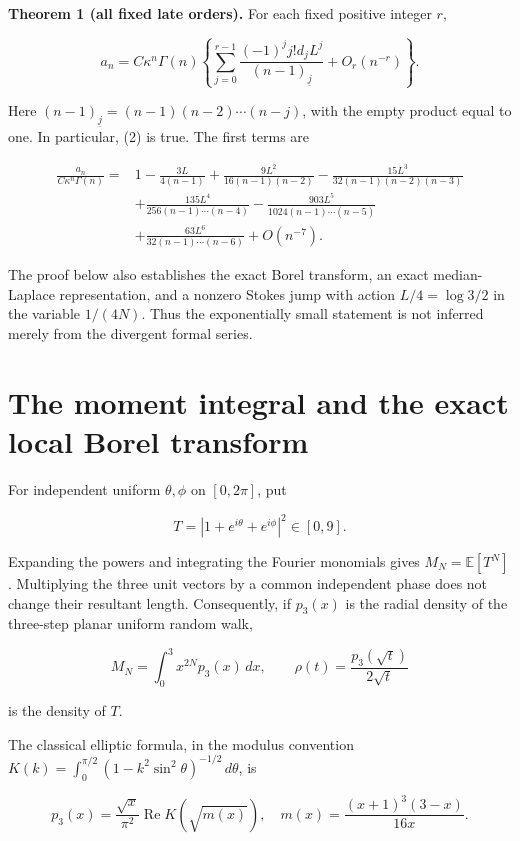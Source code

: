 \documentclass[11pt,letterpaper]{article}
\theoremstyle{remark}
\begin{document}
\textbf{Theorem 1 (all fixed late orders).} For each fixed positive
integer \(r\),

\[
\boxed{\displaystyle
 a_n=C\kappa^n\Gamma(n)
 \left\{\sum_{j=0}^{r-1}
 \frac{(-1)^j j!d_jL^j}{(n-1)_{\underline j}}+O_r(n^{-r})\right\}.}
\tag{4}
\]

Here \((n-1)_{\underline j}=(n-1)(n-2)\cdots(n-j)\), with the empty
product equal to one. In particular, (2) is true. The first terms are

\[
\begin{aligned}
\frac{a_n}{C\kappa^n\Gamma(n)}={}&1-\frac{3L}{4(n-1)}
+\frac{9L^2}{16(n-1)(n-2)}-\frac{15L^3}{32(n-1)(n-2)(n-3)}\\
&+\frac{135L^4}{256(n-1)\cdots(n-4)}
-\frac{903L^5}{1024(n-1)\cdots(n-5)}\\
&+\frac{63L^6}{32(n-1)\cdots(n-6)}+O(n^{-7}).
\end{aligned}
\tag{5}
\]

The proof below also establishes the exact Borel transform, an exact
median-Laplace representation, and a nonzero Stokes jump with action
\(L/4=\log3/2\) in the variable \(1/(4N)\). Thus the exponentially small
statement is not inferred merely from the divergent formal series.

\section{The moment integral and the exact local Borel
transform}\label{the-moment-integral-and-the-exact-local-borel-transform}

For independent uniform \(\theta,\phi\) on \([0,2\pi]\), put

\[
T=|1+e^{i\theta}+e^{i\phi}|^2\in[0,9].
\]

Expanding the powers and integrating the Fourier monomials gives
\(M_N=\mathbb E[T^N]\). Multiplying the three unit vectors by a common
independent phase does not change their resultant length. Consequently,
if \(p_3(x)\) is the radial density of the three-step planar uniform
random walk,

\[
M_N=\int_0^3x^{2N}p_3(x)\,dx,
\qquad \rho(t)=\frac{p_3(\sqrt t)}{2\sqrt t}
\tag{6}
\]

is the density of \(T\).

The classical elliptic formula, in the modulus convention
\(K(k)=\int_0^{\pi/2}(1-k^2\sin^2\theta)^{-1/2}\,d\theta\), is

\[
p_3(x)=\frac{\sqrt x}{\pi^2}\operatorname{Re}K\!\left(\sqrt{m(x)}\right),
\quad m(x)=\frac{(x+1)^3(3-x)}{16x}.
\tag{7}
\]
\end{document}
